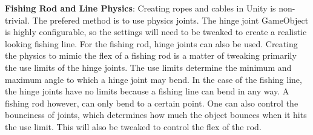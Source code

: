 \documentclass[10pt,journal,compsoc,onecolumn, draftclsnofoot]{IEEEtran}
\begin{document}
\hangindent=0.5cm \textbf{Fishing Rod and Line Physics}: Creating ropes and cables in Unity is non-trivial.
The prefered method is to use physics joints.
The hinge joint GameObject is highly configurable, so the settings will need to be tweaked to create a realistic looking fishing line.
For the fishing rod, hinge joints can also be used.
Creating the physics to mimic the flex of a fishing rod is a matter of tweaking primarily the use limits of the hinge joints.
The use limits determine the minimum and maximum angle to which a hinge joint may bend.\cite{unity_physics_joints}
In the case of the fishing line, the hinge joints have no limits because a fishing line can bend in any way.
A fishing rod however, can only bend to a certain point.
One can also control the bounciness of joints, which determines how much the object bounces when it hits the use limit.
This will also be tweaked to control the flex of the rod.



\end{document}
